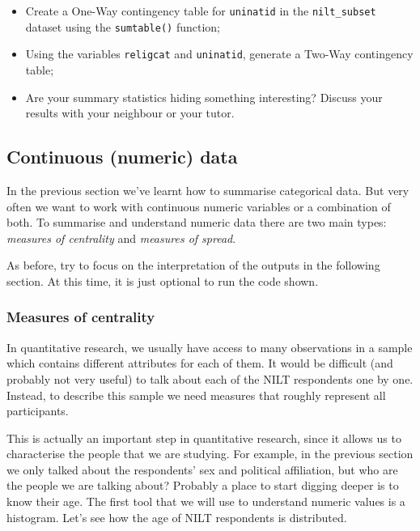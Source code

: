 \documentclass[
]{book}
\providecommand{\tightlist}{%
  \setlength{\itemsep}{0pt}\setlength{\parskip}{0pt}}
\begin{document}
\begin{itemize}
\tightlist
\item
  Create a One-Way contingency table for \texttt{uninatid} in the \texttt{nilt\_subset} dataset using the \texttt{sumtable()} function;
\item
  Using the variables \texttt{religcat} and \texttt{uninatid}, generate a Two-Way contingency table;
\item
  Are your summary statistics hiding something interesting? Discuss your results with your neighbour or your tutor.
\end{itemize}

\hypertarget{continuous-numeric-data}{%
\subsection{Continuous (numeric) data}\label{continuous-numeric-data}}

In the previous section we've learnt how to summarise categorical data. But very often we want to work with continuous numeric variables or a combination of both. To summarise and understand numeric data there are two main types: \emph{measures of centrality} and \emph{measures of spread}.

As before, try to focus on the interpretation of the outputs in the following section. At this time, it is just optional to run the code shown.

\hypertarget{measures-of-centrality}{%
\subsubsection{Measures of centrality}\label{measures-of-centrality}}

In quantitative research, we usually have access to many observations in a sample which contains different attributes for each of them. It would be difficult (and probably not very useful) to talk about each of the NILT respondents one by one. Instead, to describe this sample we need measures that roughly represent all participants.

This is actually an important step in quantitative research, since it allows us to characterise the people that we are studying. For example, in the previous section we only talked about the respondents' sex and political affiliation, but who are the people we are talking about? Probably a place to start digging deeper is to know their age. The first tool that we will use to understand numeric values is a histogram. Let's see how the age of NILT respondents is distributed.
\end{document}
